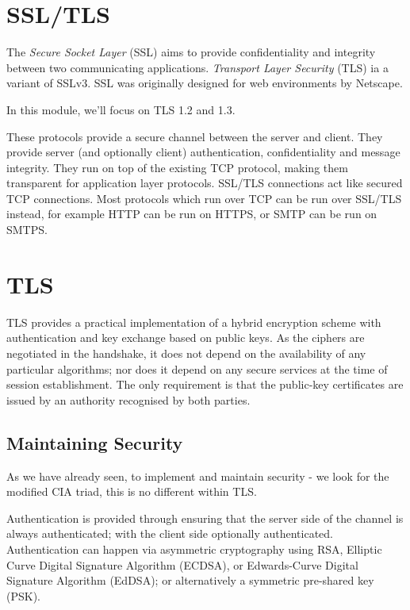 
\section{SSL/TLS}

The \textit{Secure Socket Layer} (SSL) aims to provide confidentiality and integrity between two communicating applications. \textit{Transport Layer Security} (TLS) ia a variant of SSLv3. SSL was originally designed for web environments by Netscape. 

In this module, we'll focus on TLS 1.2 and 1.3. 

These protocols provide a secure channel between the server and client. They provide server (and optionally client) authentication, confidentiality and message integrity. They run on top of the existing TCP protocol, making them transparent for application layer protocols. SSL/TLS connections act like secured TCP connections. Most protocols which run over TCP can be run over SSL/TLS instead, for example HTTP can be run on HTTPS, or SMTP can be run on SMTPS.

\section{TLS}
TLS provides a practical implementation of a hybrid encryption scheme with authentication and key exchange based on public keys. As the ciphers are negotiated in the handshake, it does not depend on the availability of any particular algorithms; nor does it depend on any secure services at the time of session establishment. The only requirement is that the public-key certificates are issued by an authority recognised by both parties. 

\subsection{Maintaining Security}
As we have already seen, to implement and maintain security - we look for the modified CIA triad, this is no different within TLS. 

Authentication is provided through ensuring that the server side of the channel is always authenticated; with the client side optionally authenticated. Authentication can happen via asymmetric cryptography using RSA, Elliptic Curve Digital Signature Algorithm (ECDSA), or Edwards-Curve Digital Signature Algorithm (EdDSA); or alternatively a symmetric pre-shared key (PSK).

